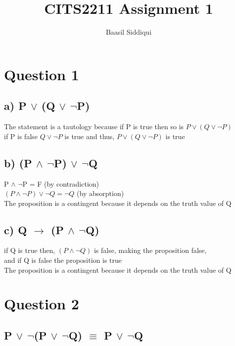 \documentclass[11pt]{article}
\title{\textbf{CITS2211 Assignment 1}}
\author{Baasil Siddiqui}
\date{}
\begin{document}
\parskip 2mm
\maketitle
\thispagestyle{empty}

\section*{Question 1}

\subsection*{a) P $\lor$ (Q $\lor$ $\neg$P)}
The statement is a tautology because if P is true then so is $P \lor (Q \lor \neg P)$ \\
if P is false $Q \lor \neg P$ is true and thus, $P \lor (Q \lor \neg P)$ is true

\subsection*{b) (P $\land$ $\neg$P) $\lor$ $\neg$Q}

P $\land$ $\neg$P = F (by contradiction) \\
$(P \land \neg P) \lor \neg Q = \neg Q$ (by absorption) \\
\newline
The proposition is a contingent because it depends on the truth value of Q


\subsection*{c) Q $\rightarrow$ (P $\land$ $\neg$Q)}
if Q is true then, $(P \land \neg Q)$ is false, making the proposition false, \\
and if Q is false the proposition is true \\
The proposition is a contingent because it depends on the truth value of Q

\section*{Question 2}
\subsection*{P $\lor$ $\neg$(P $\lor$ $\neg$Q) $\equiv$ P $\lor$ $\neg$Q}
\end{document}
